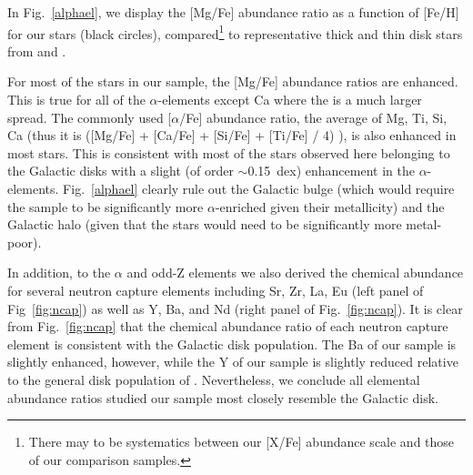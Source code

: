 \documentclass[modern]{aastex62}
\begin{document}
In Fig.~\ref{alphael}, we display the [Mg/Fe] abundance ratio as a function of [Fe/H] for our stars (black circles), compared\footnote{There may to be systematics between our [X/Fe] abundance scale and those of our comparison samples.} to representative thick and thin disk stars from \cite[open red squares]{Bensby2014} and \cite[open blue triangles]{Adibekyan2012}. 

For most of the stars in our sample, the [Mg/Fe] abundance ratios are enhanced. This is true for all of the $\alpha$-elements except Ca where the is a much larger spread. The commonly used [$\alpha$/Fe] abundance ratio, the average of Mg, Ti, Si, Ca (thus it is ([Mg/Fe] + [Ca/Fe] + [Si/Fe] + [Ti/Fe] / 4) ), is also enhanced in most stars. This is consistent with most of the stars observed here belonging to the Galactic disks with a slight (of order $\sim$0.15~dex) enhancement in the $\alpha$-elements. Fig.~\ref{alphael} clearly rule out the Galactic bulge (which would require the sample to be significantly more $\alpha$-enriched given their metallicity) and the Galactic halo (given that the stars would need to be significantly more metal-poor). %

In addition, to the $\alpha$ and odd-Z elements we also derived the chemical abundance for several neutron capture elements including Sr, Zr, La, Eu (left panel of Fig~\ref{fig:ncap}) as well as Y, Ba, and Nd (right panel of Fig.~\ref{fig:ncap}).  It is clear from Fig.~\ref{fig:ncap}  that the chemical abundance ratio of each neutron capture element is consistent with the Galactic disk population. The Ba of our sample is slightly enhanced, however, while the Y of our sample is slightly reduced relative to the general disk population of \cite{Bensby2014}. Nevertheless, we conclude all elemental abundance ratios studied our sample most closely resemble the Galactic disk. 

\begin{figure*}
\caption{\label{fig:ncap}
The [Mg/Fe], [Si/Fe], [Ti/Fe], [V/Fe] (left panel) and [Al/Fe], [Ca/Fe], [Ni/Fe], [Cr/Fe] (right panel) abundance ratios as a function of iron for our stars (black circles). We also show a representative sample of Galactic disk stars from \citet[red,][]{Bensby2014}, \citet[blue][]{Battistini2016}. These elemental ratios give a representive example of the chemical composition of our sample and show they are consistent with the Galactic disk population. } %
\end{figure*}
\end{document}
